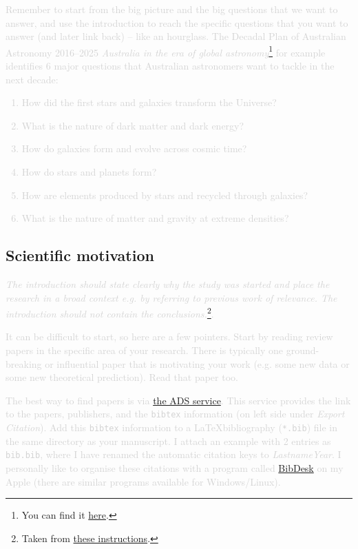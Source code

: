 \documentclass[fleqn,usenatbib]{mnras}
\newcommand{\comment}[1]{\textcolor{lightgray}{#1}}
\begin{document}
\comment{Remember to start from the big picture and the big questions that we want to answer, and use the introduction to reach the specific questions that you want to answer (and later link back) -- like an hourglass. The Decadal Plan of Australian Astronomy 2016--2025 \textit{Australia in the era of global astronomy}\footnote{You can find it \href{https://www.science.org.au/supporting-science/science-sector-analysis/reports-and-publications/decadal-plan-australian-astronomy-2016-25}{here}.} for example identifies 6 major questions that Australian astronomers want to tackle in the next decade: 
\begin{enumerate}
    \item How did the first stars and galaxies transform the Universe?
    \item What is the nature of dark matter and dark energy?
    \item How do galaxies form and evolve across cosmic time?
    \item How do stars and planets form?
    \item How are elements produced by stars and recycled through galaxies?
    \item What is the nature of matter and gravity at extreme densities?
\end{enumerate}}

\subsection{Scientific motivation}

\comment{\textit{The introduction should state clearly why the study was started and place the research in a broad context e.g. by referring to previous work of relevance. The introduction should not contain the conclusions.}\footnote{Taken from \href{https://www.aanda.org/doc_journal/instructions/aadoc.pdf}{these instructions}.}.}

\comment{It can be difficult to start, so here are a few pointers. Start by reading review papers in the specific area of your research. There is typically one ground-breaking or influential paper that is motivating your work (e.g. some new data or some new theoretical prediction). Read that paper too.}

\comment{The best way to find papers is via \href{https://ui.adsabs.harvard.edu}{the ADS service}. This service provides the link to the papers, publishers, and the \texttt{bibtex} information (on left side under \textit{Export Citation}). Add this \texttt{bibtex} information to a \LaTeX bibliography (\texttt{*.bib}) file in the same directory as your manuscript. I attach an example with 2 entries as \texttt{bib.bib}, where I have renamed the automatic citation keys to \textit{LastnameYear}. I personally like to organise these citations with a program called \href{https://bibdesk.sourceforge.io}{BibDesk} on my Apple (there are similar programs available for Windows/Linux).}
\end{document}
